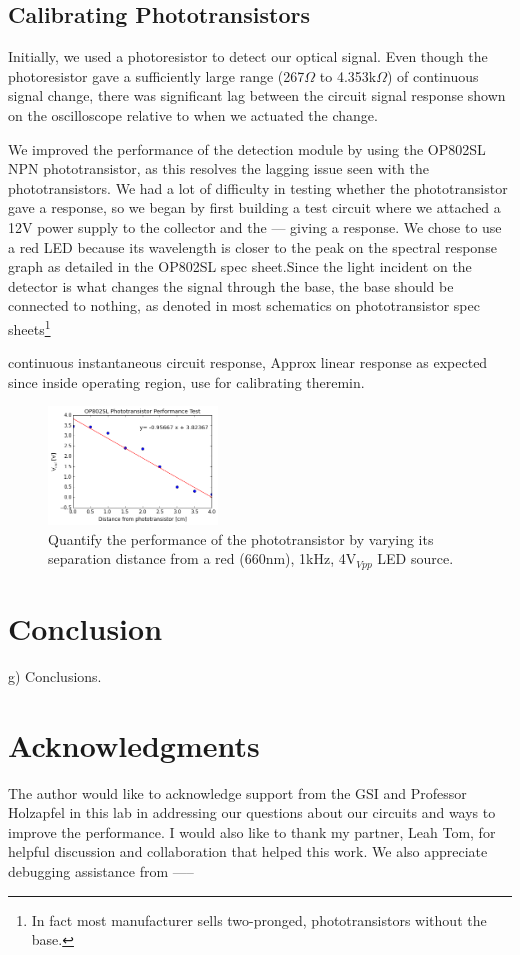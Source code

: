 \documentclass[authoryear, 12pt,5p, times]{elsarticle}
\begin{document}
\subsection{Calibrating Phototransistors}
\par Initially, we used a photoresistor to detect our optical signal. Even though the photoresistor gave a sufficiently large range (267$\Omega$ to 4.353k$\Omega$) of continuous signal change, there was significant lag between the circuit signal response shown on the oscilloscope relative to when we actuated the change. 
\par We improved the performance of the detection module by using the OP802SL NPN phototransistor, as this resolves the lagging issue seen with the phototransistors. We had a lot of difficulty in testing whether the phototransistor gave a response, so we began by first building a test circuit where we attached a 12V power supply to the collector and the --- giving a response.  We chose to use a red LED because its wavelength is closer to the peak on the spectral response graph as detailed in the OP802SL spec sheet.Since the light incident on the detector is what changes the signal through the base, the base should be connected to nothing, as denoted in most schematics on phototransistor spec sheets\footnote{In fact most manufacturer sells two-pronged, phototransistors without the base.}
\par  continuous instantaneous circuit response,
Approx linear response as expected since inside operating region, use for calibrating theremin. 
\begin{figure}[h!]
 \centering
 \includegraphics[width=0.4\textwidth]{figure/phototransistor_performance}
\caption{Quantify the performance of the phototransistor by varying its separation distance from a red (660nm), 1kHz, 4V$_{Vpp}$ LED source.}
\label{phototransistor_performance}
\end{figure}
\section{Conclusion}
g)              Conclusions.
\section*{Acknowledgments}
The author would like to acknowledge support from the GSI and Professor Holzapfel in this lab in addressing our questions about our circuits and ways to improve the performance. I would also like to thank my partner, Leah Tom, for helpful discussion and collaboration that helped this work. We also appreciate debugging assistance from ----- 
\begin{footnotesize}
\end{footnotesize}
\end{document}
